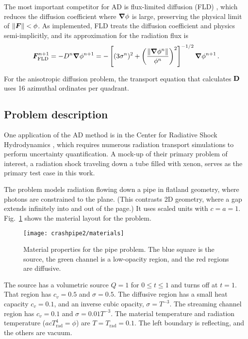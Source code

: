 \documentclass[11pt,letter,twoside]{mc2011}
\newcommand{\Dtens}{\mat{D}}
\begin{document}
The most important competitor for AD is flux-limited diffusion (FLD)
\cite{Ols2000}, which
reduces the diffusion coefficient where $\bm{\nabla} \phi$ is large, preserving the
physical limit of $\left\| \bm{F} \right\| < \phi$.
As implemented, FLD treats the diffusion
coefficient and physics semi-implicitly, and its approximation for the
radiation flux is
\begin{equation*}
  \bm{F}_\text{FLD}^{n+1} = - D^{n} \bm{\nabla} \phi^{n+1}  = -\left[ (3\sigma^{n})^2
  + \left( \frac{\left\| \bm{\nabla} \phi^{n} \right\|}{\phi^{n}}  \right)^2 \right]^{-1/2}
  \bm{\nabla} \phi^{n+1}\,.
\end{equation*}

For the anisotropic diffusion problem, the transport equation that calculates
$\Dtens$ uses 16 azimuthal ordinates per quadrant.
\subsection{Problem description}
One application of the AD method is in the Center for Radiative Shock
Hydrodynamics \cite{Crash2010}, which requires numerous radiation transport simulations
to perform uncertainty quantification. A mock-up of their primary problem
of interest, a radiation shock traveling down a tube filled with xenon, serves
as the primary test case in this work.

The problem models radiation flowing down a pipe in flatland geometry, where
photons are constrained to the plane. (This contrasts 2D geometry, where a gap
extends infinitely into and out of the page.) It uses scaled units with $c=a=1$. Fig.~\ref{fig:crashpipeMaterial}
shows the material layout for the problem.
\begin{figure}[htb]
  \centering
  \texttt{[image: crashpipe2/materials]}
  \caption{Material properties for the pipe problem. The blue square is the
  source, the green channel is a low-opacity region, and the red regions are
  diffusive.}
  \label{fig:crashpipeMaterial}
\end{figure}
The source has a volumetric source
$Q=1$ for $0 \le t \le 1$ and turns off at $t=1$.
That region has $c_v=0.5$ and
$\sigma=0.5$. The diffusive region has a small heat capacity $c_v=0.1$, and an
inverse cubic opacity, $\sigma=T^{-3}$. The streaming channel region has
$c_v=0.1$ and $\sigma=0.01 T^{-3}$. The material temperature and radiation
temperature ($a c T_\text{rad}^4 = \phi$) are $T=T_\text{rad}=0.1$. The left
boundary is reflecting, and the others are vacuum.
\end{document}
